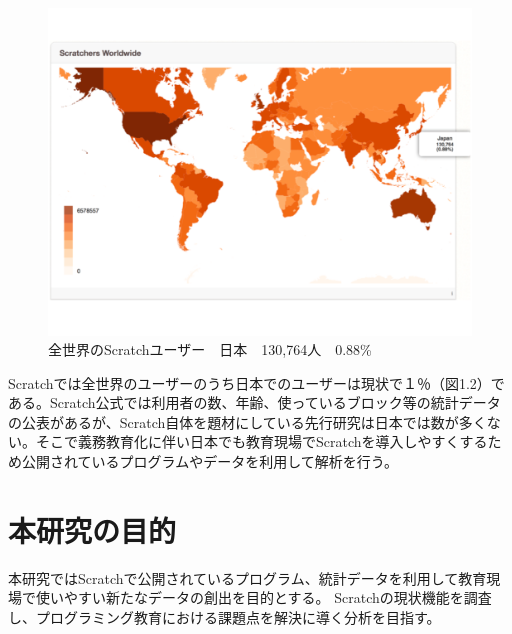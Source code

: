 \documentclass[a4paper,10pt,onecolumn,oneside,openany]{jsbook}
\begin{document}
\begin{figure}[h]
  \centering
    \includegraphics[scale=0.4]{graphic/world_japan.pdf}
  \caption{全世界のScratchユーザー　日本　130,764人　0.88\%}
   \end{figure}
Scratchでは全世界のユーザーのうち日本でのユーザーは現状で１％（図1.2）である。Scratch公式では利用者の数、年齢、使っているブロック等の統計データの公表があるが、Scratch自体を題材にしている先行研究は日本では数が多くない。そこで義務教育化に伴い日本でも教育現場でScratchを導入しやすくするため公開されているプログラムやデータを利用して解析を行う。

\newpage
\section{本研究の目的}

本研究ではScratchで公開されているプログラム、統計データを利用して教育現場で使いやすい新たなデータの創出を目的とする。
Scratchの現状機能を調査し、プログラミング教育における課題点を解決に導く分析を目指す。




\end{document}
